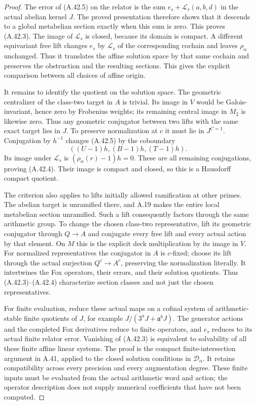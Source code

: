 \begin{proof}
The error of (A.42.5) on the relator is the sum
$e_s+\mathcal L_s(a,b,d)$ in the actual abelian kernel $J$.
The proved presentation therefore shows that it descends to
a global metabelian section exactly when this sum is zero.
This proves (A.42.3). The image of $\mathcal L_s$ is closed,
because its domain is compact. A different equivariant free
lift changes $e_s$ by $\mathcal L_s$ of the corresponding
cochain and leaves $\rho_\alpha$ unchanged. Thus it translates
the affine solution space by that same cochain and preserves
the obstruction and the resulting sections. This gives the
explicit comparison between all choices of affine origin.

It remains to identify the quotient on the solution space.
The geometric centralizer of the class-two target in $A$ is
trivial. Its image in $V$ would be Galois-invariant, hence
zero by Frobenius weights; its remaining central image in
$M_2$ is likewise zero. Thus any geometric conjugator between
two lifts with the same exact target lies in $J$. To preserve
normalization at $c$ it must lie in $J^{C=1}$. Conjugation
by $h^{-1}$ changes (A.42.5) by the coboundary
\[
        ((U-1)h,(B-1)h,(T-1)h).
 \tag{A.42.8}
\]
Its image under $\mathcal L_s$ is
$(\rho_\alpha(r)-1)h=0$. These are all remaining
conjugations, proving (A.42.4). Their image is compact and
closed, so this is a Hausdorff compact quotient.

The criterion also applies to lifts initially allowed
ramification at other primes. The abelian target is
unramified there, and A.19 makes the entire local
metabelian section unramified. Such a lift consequently
factors through the same arithmetic group. To change the
chosen class-two representative, lift its geometric
conjugator through $Q\to A$ and conjugate every free lift
and every actual action by that element. On $M$ this is
the explicit deck multiplication by its image in $V$.
For normalized representatives the conjugator in $A$
is $c$-fixed; choose its lift through the actual
surjection $Q^c\to A^c$, preserving the normalization
literally.
It intertwines the Fox operators, their errors, and their
solution quotients. Thus (A.42.3)--(A.42.4) characterize
section classes and not just the chosen representatives.

For finite evaluation, reduce these actual maps on a
cofinal system of arithmetic-stable finite quotients of
$J$, for example $J/(3^aJ+\mathfrak a^bJ)$. The generator
actions and the completed Fox derivatives reduce to finite
operators, and $e_s$ reduces to its actual finite relator
error. Vanishing of (A.42.3) is equivalent to solvability
of all these finite affine linear systems. The proof is
the compact finite-intersection argument in A.41, applied
to the closed solution conditions in $\mathcal D_\alpha$.
It retains compatibility across every precision and every
augmentation degree. These finite inputs must be evaluated
from the actual arithmetic word and action; the operator
description does not supply numerical coefficients that
have not been computed.


\end{proof}
